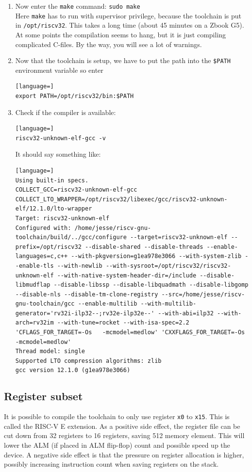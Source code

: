 \documentclass[12pt]{article}
\begin{document}
\begin{enumerate}
\item Now enter the \lstinline|make| command: \lstinline|sudo make|\\
Here \lstinline|make| has to run with supervisor privilege, because the toolchain is put in \lstinline|/opt/riscv32|. This takes a long time (about 45 minutes on a Zbook G5). At some points the compilation seems to hang, but it is just compiling complicated C-files. By the way, you will see a lot of warnings.
\item Now that the toolchain is setup, we have to put the path into the \lstinline|$PATH| environment variable so enter
\begin{lstlisting}[language=]
export PATH=/opt/riscv32/bin:$PATH
\end{lstlisting}
\item Check if the compiler is available:
\begin{lstlisting}[language=]
riscv32-unknown-elf-gcc -v
\end{lstlisting}
It should say something like:
\begin{lstlisting}[language=]
Using built-in specs.
COLLECT_GCC=riscv32-unknown-elf-gcc
COLLECT_LTO_WRAPPER=/opt/riscv32/libexec/gcc/riscv32-unknown-elf/12.1.0/lto-wrapper
Target: riscv32-unknown-elf
Configured with: /home/jesse/riscv-gnu-toolchain/build/../gcc/configure --target=riscv32-unknown-elf --prefix=/opt/riscv32 --disable-shared --disable-threads --enable-languages=c,c++ --with-pkgversion=g1ea978e3066 --with-system-zlib --enable-tls --with-newlib --with-sysroot=/opt/riscv32/riscv32-unknown-elf --with-native-system-header-dir=/include --disable-libmudflap --disable-libssp --disable-libquadmath --disable-libgomp --disable-nls --disable-tm-clone-registry --src=/home/jesse/riscv-gnu-toolchain/gcc --enable-multilib --with-multilib-generator='rv32i-ilp32--;rv32e-ilp32e--' --with-abi=ilp32 --with-arch=rv32im --with-tune=rocket --with-isa-spec=2.2 'CFLAGS_FOR_TARGET=-Os   -mcmodel=medlow' 'CXXFLAGS_FOR_TARGET=-Os   -mcmodel=medlow'
Thread model: single
Supported LTO compression algorithms: zlib
gcc version 12.1.0 (g1ea978e3066) 
\end{lstlisting}
\end{enumerate}

\subsection{Register subset}
It is possible to compile the toolchain to only use register \texttt{x0} to \texttt{x15}. This is called the RISC-V E extension. As a positive side effect, the register file can be cut down from 32 registers to 16 registers, saving 512 memory element. This will lower the ALM (if placed in ALM flip-flop) count and possible speed up the device. A negative side effect is that the pressure on register allocation is higher, possibly increasing instruction count when saving registers on the stack.
\end{document}
